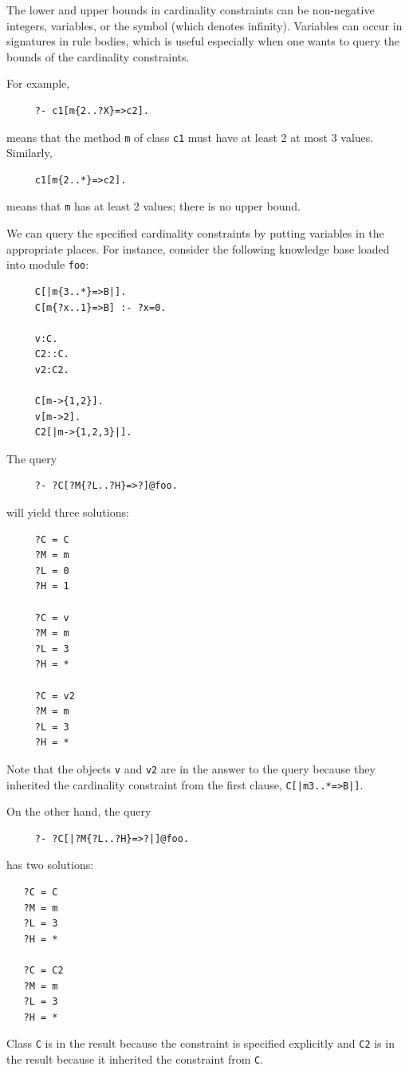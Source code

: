 \documentclass[11pt]{article}
\begin{document}
The lower and upper bounds in cardinality constraints can be non-negative
integers, variables, or the symbol {\tt *} (which denotes
infinity). Variables can occur in signatures in rule bodies, which is
useful especially when one wants to query the bounds of the cardinality
constraints.

For example,
\begin{verbatim}
     ?- c1[m{2..?X}=>c2].
\end{verbatim}
means that the method {\tt m}  of class {\tt c1} must have at least 2 at
most 3 values. Similarly,
\begin{verbatim}
     c1[m{2..*}=>c2]. 
\end{verbatim}
means that {\tt m}  has at least 2 values; there is no upper bound.

We can query the specified cardinality constraints by putting variables in
the appropriate places. For instance, consider the following knowledge base
loaded into module {\tt foo}: 
\begin{verbatim}
     C[|m{3..*}=>B|].
     C[m{?x..1}=>B] :- ?x=0.

     v:C.
     C2::C.
     v2:C2.
   
     C[m->{1,2}].
     v[m->2].
     C2[|m->{1,2,3}|].
\end{verbatim}
The query
\begin{verbatim}
     ?- ?C[?M{?L..?H}=>?]@foo. 
\end{verbatim}
will yield three solutions:
\begin{verbatim}
     ?C = C 
     ?M = m
     ?L = 0
     ?H = 1

     ?C = v
     ?M = m
     ?L = 3
     ?H = *

     ?C = v2
     ?M = m
     ?L = 3
     ?H = *
\end{verbatim}
Note that the objects {\tt v} and {\tt v2} are in the answer to the query
because they inherited the cardinality constraint
from the first clause, {\tt C[|m{3..*}=>B|]}.

On the other hand, the query
\begin{verbatim}
     ?- ?C[|?M{?L..?H}=>?|]@foo.
\end{verbatim}
has two solutions:
\begin{verbatim}
   ?C = C 
   ?M = m
   ?L = 3
   ?H = *
   
   ?C = C2
   ?M = m
   ?L = 3
   ?H = *
\end{verbatim}
Class {\tt C} is in the result because the constraint is specified
explicitly and {\tt C2} is in the result because it inherited the
constraint from {\tt C}.   
\end{document}
